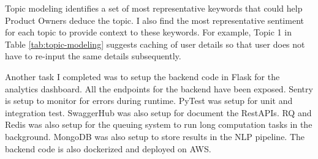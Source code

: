 \noindent
Topic modeling identifies a set of most representative keywords that could help Product Owners deduce the topic. I also find the most representative sentiment for each topic to provide context to these keywords. For example, Topic 1 in Table \ref{tab:topic-modeling} suggests caching of user details so that user does not have to re-input the same details subsequently.

\noindent
Another task I completed was to setup the backend code in Flask for the analytics dashboard. All the endpoints for the backend have been exposed. Sentry is setup to monitor for errors during runtime. PyTest was setup for unit and integration test. SwaggerHub was also setup for document the RestAPIs. RQ and Redis was also setup for the queuing system to run long computation tasks in the background. MongoDB was also setup to store results in the NLP pipeline. The backend code is also dockerized and deployed on AWS.